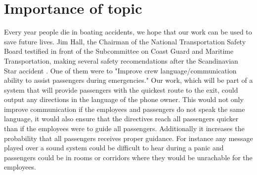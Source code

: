 \chapter{Importance of topic}
\label{ch:importance}

Every year people die in boating accidents, we hope that our work can be
used to save future lives. Jim Hall, the Chairman of the National Transportation 
Safety Board testified in front of the Subcommittee on Coast Guard and Maritime 
Transportation, making several safety recomendations after the Scandinavian Star
accident \cite{ntsb}. One of them were to "Improve crew language/communication 
ability to assist passengers during emergencies." Our work, which will be part of a system
that will provide passengers with the quickest route to the exit, could output 
any directions in the language of the phone owner. This would not only improve 
communication if the employees and passengers do not speak the same language, 
it would also ensure that the directives reach all passengers quicker than if the employees 
were to guide all passengers. Additionally it increases the probability that all passengers 
receives proper guidance. For instance any message played over a sound system could be
difficult to hear during a panic and passengers could be in rooms or corridors
where they would be unrachable for the employees.
